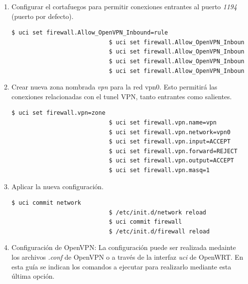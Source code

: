 \documentclass[12pt]{article}
\begin{document}
\begin{enumerate}
\begin{enumerate}
                        \item Configurar el cortafuegos para permitir conexiones entrantes al puerto \textit{1194} (puerto por defecto).

                        \begin{lstlisting}[language=bash]
                            $ uci set firewall.Allow_OpenVPN_Inbound=rule
                            $ uci set firewall.Allow_OpenVPN_Inbound.target=ACCEPT
                            $ uci set firewall.Allow_OpenVPN_Inbound.src=*
                            $ uci set firewall.Allow_OpenVPN_Inbound.proto=udp
                            $ uci set firewall.Allow_OpenVPN_Inbound.dest_port=1194    
                        \end{lstlisting}

                        \item Crear nueva zona nombrada \textit{vpn} para la red vpn0. Esto permitirá las conexiones relacionadas con el tunel VPN, tanto entrantes como salientes.

                        \begin{lstlisting}[language=bash]
                            $ uci set firewall.vpn=zone
                            $ uci set firewall.vpn.name=vpn
                            $ uci set firewall.vpn.network=vpn0
                            $ uci set firewall.vpn.input=ACCEPT
                            $ uci set firewall.vpn.forward=REJECT
                            $ uci set firewall.vpn.output=ACCEPT
                            $ uci set firewall.vpn.masq=1
                        \end{lstlisting}

                        \item Aplicar la nueva configuración.

                        \begin{lstlisting}[language=bash]
                            $ uci commit network
                            $ /etc/init.d/network reload
                            $ uci commit firewall
                            $ /etc/init.d/firewall reload  
                        \end{lstlisting}

                        \item Configuración de OpenVPN:
                        La configuración puede ser realizada medainte los archivos \textit{.conf} de OpenVPN o a través de la interfaz \textit{uci} de OpenWRT. En esta guía se indican los comandos a ejecutar para realizarlo mediante esta última opción.


\end{enumerate}
\end{enumerate}
\end{document}
